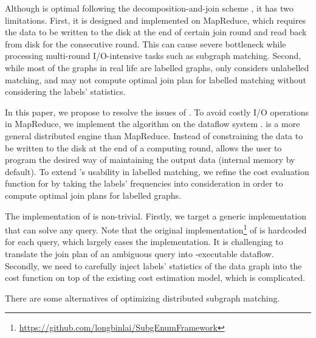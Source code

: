  Although \cliquejoin is optimal following the decomposition-and-join scheme \cite{Lai2016}, it has two limitations. First, it is designed and implemented on MapReduce, which requires the data to be written to the disk at the end of certain join round and read back from disk for the consecutive round. This can cause severe bottleneck while processing multi-round I/O-intensive tasks such as subgraph matching. Second, while most of the graphs in real life are labelled graphs, \cliquejoin only considers unlabelled matching, and may not compute optimal join plan for labelled matching without considering the labels' statistics.

In this paper, we propose \gencliqjoin to resolve the issues of \cliquejoin. To avoid costly I/O operations in MapReduce, we implement the algorithm on the \timely dataflow system \cite{Murray2013}. \timely is a more general distributed engine than MapReduce. Instead of constraining the data to be written to the disk at the end of a computing round, \timely allows the user to program the desired way of maintaining the output data (internal memory by default). To extend \cliquejoin's usability in labelled matching, we refine the cost evaluation function for \cliquejoin by taking the labels' frequencies into consideration in order to compute optimal join plans for labelled graphs.

The implementation of \gencliqjoin is non-trivial. Firstly, we target a generic implementation that can solve any query. Note that the original implementation\footnote{\url{https://github.com/longbinlai/SubgEnumFramework}} of \cliquejoin is hardcoded for each query, which largely eases the implementation. It is challenging to translate the join plan of an ambiguous query into \timely-executable dataflow. Secondly, we need to carefully inject labels' statistics of the data graph into the cost function on top of the existing \cliquejoin cost estimation model, which is complicated.

There are some alternatives of optimizing distributed subgraph matching.

